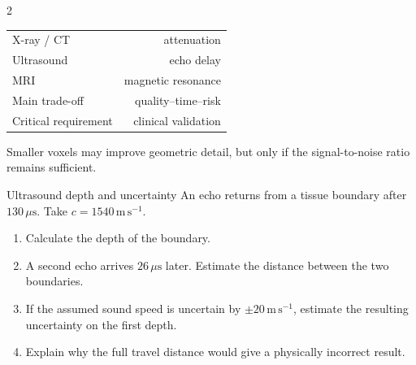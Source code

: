 \begin{multicols}{2}
\begin{keyfigures}
\begin{tabularx}{\linewidth}{@{}Xr@{}}
X-ray / CT & attenuation\\
Ultrasound & echo delay\\
MRI & magnetic resonance\\
Main trade-off & quality--time--risk\\
Critical requirement & clinical validation
\end{tabularx}
\end{keyfigures}

\begin{tcolorbox}[title=\sffamily\bfseries Resolution and acquisition time,colback=white,colframe=ECRed]
\begin{center}
\end{center}
\footnotesize Smaller voxels may improve geometric detail, but only if the signal-to-noise ratio remains sufficient.
\end{tcolorbox}

\begin{applicationexercise}{Ultrasound depth and uncertainty}
An echo returns from a tissue boundary after $130\,\mu\mathrm{s}$. Take $c=1540\,\mathrm{m\,s^{-1}}$.
\begin{enumerate}
\item Calculate the depth of the boundary.
\item A second echo arrives $26\,\mu\mathrm{s}$ later. Estimate the distance between the two boundaries.
\item If the assumed sound speed is uncertain by $\pm 20\,\mathrm{m\,s^{-1}}$, estimate the resulting uncertainty on the first depth.
\item Explain why the full travel distance would give a physically incorrect result.
\end{enumerate}
\end{applicationexercise}


\end{multicols}
